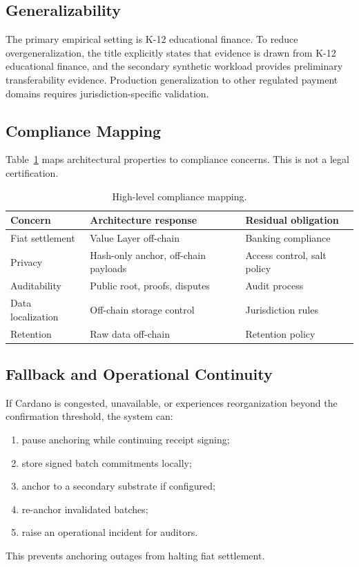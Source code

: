 \documentclass[journal]{IEEEtran}
\begin{document}
\subsection{Generalizability}
The primary empirical setting is K-12 educational finance. To reduce overgeneralization, the title explicitly states that evidence is drawn from K-12 educational finance, and the secondary synthetic workload provides preliminary transferability evidence. Production generalization to other regulated payment domains requires jurisdiction-specific validation.

\subsection{Compliance Mapping}
Table~\ref{tab:compliance} maps architectural properties to compliance concerns. This is not a legal certification.

\begin{table}[!t]
\centering
\caption{High-level compliance mapping.}
\label{tab:compliance}
\small
\begin{tabular}{@{}p{2.1cm} p{2.8cm} p{2.5cm}@{}}
\toprule
\textbf{Concern} & \textbf{Architecture response} & \textbf{Residual obligation} \\
\midrule
Fiat settlement & Value Layer off-chain & Banking compliance \\
Privacy & Hash-only anchor, off-chain payloads & Access control, salt policy \\
Auditability & Public root, proofs, disputes & Audit process \\
Data localization & Off-chain storage control & Jurisdiction rules \\
Retention & Raw data off-chain & Retention policy \\
\bottomrule
\end{tabular}
\end{table}

\subsection{Fallback and Operational Continuity}
If Cardano is congested, unavailable, or experiences reorganization beyond the confirmation threshold, the system can:
\begin{enumerate}[nosep,leftmargin=2em]
    \item pause anchoring while continuing receipt signing;
    \item store signed batch commitments locally;
    \item anchor to a secondary substrate if configured;
    \item re-anchor invalidated batches;
    \item raise an operational incident for auditors.
\end{enumerate}
This prevents anchoring outages from halting fiat settlement.
\end{document}
